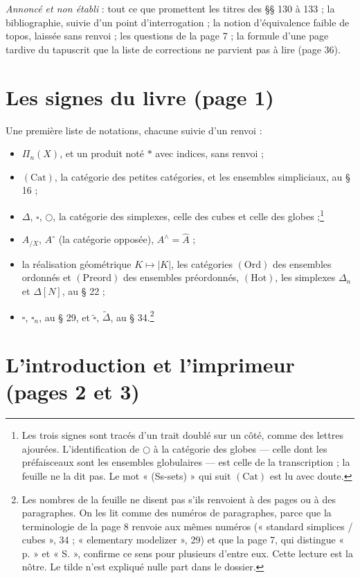 \documentclass[11pt,a4paper]{article}
\begin{document}
\emph{Annoncé et non établi} : tout ce que promettent les titres des §§ 130 à
133 ; la bibliographie, suivie d'un point d'interrogation ; la notion
d'équivalence faible de topos, laissée sans renvoi ; les questions de la
page 7 ; la formule d'une page tardive du tapuscrit que la liste de
corrections ne parvient pas à lire (page 36).

\section*{Les signes du livre (page 1)}

Une première liste de notations, chacune suivie d'un renvoi :
\begin{itemize}
\item $\Pi_{n}(X)$, et un produit noté $*$ avec indices, sans renvoi ;
\item $(\mathrm{Cat})$, la catégorie des petites catégories, et les
ensembles simpliciaux, au § 16 ;
\item $\Delta$, $\square$, $\bigcirc$, la catégorie des simplexes, celle des
cubes et celle des globes ;\footnote{Les trois signes sont tracés d'un trait
doublé sur un côté, comme des lettres ajourées. L'identification de
$\bigcirc$ à la catégorie des globes --- celle dont les préfaisceaux sont les
ensembles globulaires --- est celle de la transcription ; la feuille ne la dit
pas. Le mot « (Ss-sets) » qui suit $(\mathrm{Cat})$ est lu avec doute.}
\item $A_{/X}$, $A^{\circ}$ (la catégorie opposée), $A^{\wedge} = \widehat{A}$ ;
\item la réalisation géométrique $K \mapsto |K|$, les catégories
$(\mathrm{Ord})$ des ensembles ordonnés et $(\mathrm{Preord})$ des ensembles
préordonnés, $(\mathrm{Hot})$, les simplexes $\Delta_{n}$ et $\Delta[N]$, au
§ 22 ;
\item $\square$, $\square_{n}$, au § 29, et $\tilde{\square}$,
$\tilde{\Delta}$, au § 34.\footnote{Les nombres de la feuille ne disent pas
s'ils renvoient à des pages ou à des paragraphes. On les lit comme des numéros
de paragraphes, parce que la terminologie de la page 8 renvoie aux mêmes
numéros (« standard simplices / cubes », 34 ; « elementary modelizer », 29)
et que la page 7, qui distingue « p. » et « S. », confirme ce sens pour
plusieurs d'entre eux. Cette lecture est la nôtre. Le tilde n'est expliqué
nulle part dans le dossier.}
\end{itemize}

\section*{L'introduction et l'imprimeur (pages 2 et 3)}
\end{document}
